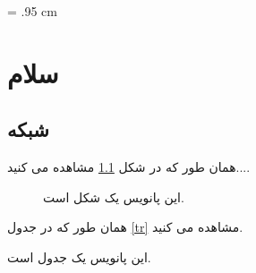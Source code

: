 \documentclass{report}
\begin{document}
\baselineskip = .95 cm
\listoffigures
\clearpage
\listoftables
\clearpage

\chapter{سلام}
\section{شبکه}

همان طور که در شکل \ref{fr} مشاهده می کنید....

\begin{figure}
\caption{این پانویس یک شکل است.}
\label{fr}
\end{figure}

همان طور که در جدول \ref{tr} مشاهده می کنید. 
\begin{table}
\caption{این پانویس یک جدول است.}
\label{tr}
\end{table}
\end{document}
